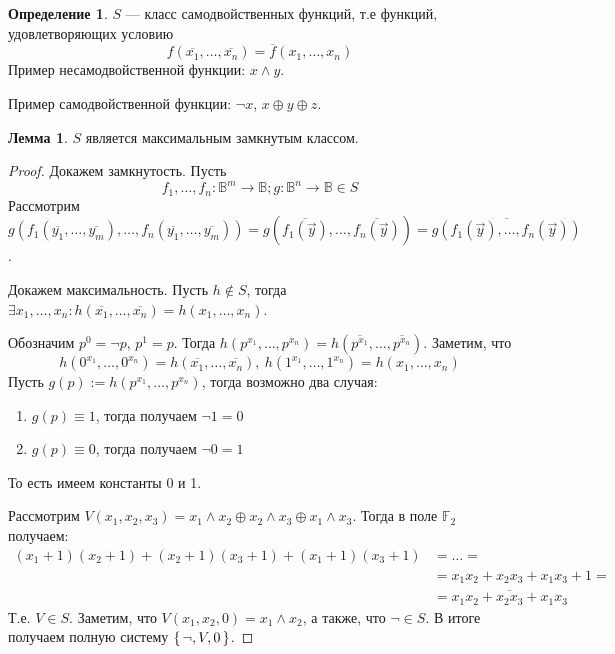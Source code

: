 \documentclass[12pt]{article}
\let\eq\equiv
\let\la\land
\let\n\neg
\let\nin\notin
\theoremstyle{definition}
\newtheorem{definition}{Определение}[section]
\theoremstyle{statement}
\theoremstyle{theorem}
\newtheorem{lemma}{Лемма}[section]
\begin{document}
\begin{definition}
  $S$ --- класс самодвойственных функций, т.е функций, удовлетворяющих условию
  \begin{displaymath}
    f(\overline{x_1}, \dots, \overline{x_n}) = \overline{f}(x_1, \dots, x_n)
  \end{displaymath}
  Пример несамодвойственной функции: $x \la y$.

  Пример самодвойственной функции: $\n x$, $x \oplus y \oplus z$.
\end{definition}
\begin{lemma}
  $S$ является максимальным замкнутым классом.
  \begin{proof}
    Докажем замкнутость. Пусть
    \begin{displaymath}
      f_1, \dots, f_n \colon \mathbb{B}^m \to \mathbb{B}; g \colon
      \mathbb{B}^n \to \mathbb{B} \in S
    \end{displaymath}
    Рассмотрим $g(f_1(\overline{y_1}, \dots, \overline{y_m}), \dots,
    f_n(\overline{y_1}, \dots, \overline{y_m})) =
    g(\overline{f_1(\vec{y})}, \dots, \overline{f_n(\vec{y})}) =
    \overline{g(f_1(\vec{y}), \dots, f_n(\vec{y}))}$.

    Докажем максимальность. Пусть $h \nin S$, тогда $\exists x_1,
    \dots, x_n \colon h(\overline{x_1}, \dots, \overline{x_n}) =
    h(x_1, \dots, x_n)$.

    Обозначим $p^0 = \n p$, $p^1 = p$. Тогда $h(p^{x_1}, \dots,
    p^{x_n}) = h(\overline{p^{x_1}}, \dots, \overline{p^{x_n}})$. Заметим, что
    \begin{displaymath}
      h(0^{x_1}, \dots, 0^{x_n}) = h(\overline{x_1}, \dots,
      \overline{x_n}),\ h(1^{x_1}, \dots, 1^{x_n}) = h(x_1, \dots, x_n)
    \end{displaymath}
    Пусть $g(p) := h(p^{x_1}, \dots, p^{x_n})$, тогда возможно два случая:
    \begin{enumerate}
      \item $g(p) \eq 1$, тогда получаем $\n 1 = 0$

      \item $g(p) \eq 0$, тогда получаем $\n 0 = 1$
    \end{enumerate}
    То есть имеем константы 0 и 1.

    Рассмотрим $V(x_1, x_2, x_3) = x_1 \la x_2 \oplus x_2 \la x_3
    \oplus x_1 \la x_3$. Тогда в поле $\mathbb{F}_2$ получаем:
    \begin{align*}
      (x_1 + 1)(x_2 + 1) + (x_2 + 1)(x_3 + 1) + (x_1 + 1)(x_3 + 1) &=
      \dots =\\&=
      x_1x_2 + x_2x_3 + x_1x_3 + 1 =\\&= \overline{x_1x_2 + x_2x_3 + x_1x_3}
    \end{align*}
    Т.е. $V \in S$. Заметим, что $V(x_1, x_2, 0) = x_1 \land x_2$, а
    также, что $\n \in S$. В итоге получаем полную систему $\set{\n, V, 0}$.
  \end{proof}
\end{lemma}
\end{document}
